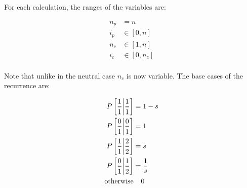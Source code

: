 \documentclass[review]{elsarticle}
\newcommand{\Dfrac}[2]{%
  \ooalign{%
    $\genfrac{}{}{1.2pt}0{#1}{#2}$\cr%
    $\color{white}\genfrac{}{}{.4pt}0{\phantom{#1}}{\phantom{#2}}$}%
}
\newcommand{\cond}{\middle\vert}
\begin{document}
For each calculation, the ranges of the variables are:

\begin{equation}
  \begin{aligned}
    n_p &= n \\
    i_p &\in [0, n] \\
    n_c &\in [1, n] \\
    i_c &\in [0, n_c] \\
  \end{aligned}
\end{equation}

Note that unlike in the neutral case $n_c$ is now variable. The base cases of the recurrence are:

\begin{equation*}
  \begin{aligned}
    P\left[ \Dfrac{1}{1} \cond \Dfrac{1}{1} \right] &= 1-s \\
    P\left[ \Dfrac{0}{1} \cond \Dfrac{0}{1} \right] &= 1 \\
    P\left[ \Dfrac{1}{1} \cond \Dfrac{2}{2} \right] &= s \\
    P\left[ \Dfrac{0}{1} \cond \Dfrac{1}{2} \right] &= \frac{1}{s} \\
    \text{otherwise} &\phantom{{}=} 0
  \end{aligned}
\end{equation*}
\end{document}
